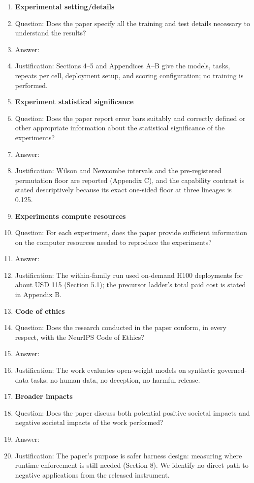 \documentclass{article}
\begin{document}
\begin{enumerate}
\item {\bf Experimental setting/details}
    \item[] Question: Does the paper specify all the training and test details necessary to understand the results?
    \item[] Answer: \answerYes{}
    \item[] Justification: Sections 4--5 and Appendices A--B give the models, tasks, repeats per cell, deployment setup, and scoring configuration; no training is performed.

\item {\bf Experiment statistical significance}
    \item[] Question: Does the paper report error bars suitably and correctly defined or other appropriate information about the statistical significance of the experiments?
    \item[] Answer: \answerYes{}
    \item[] Justification: Wilson and Newcombe intervals and the pre-registered permutation floor are reported (Appendix C), and the capability contrast is stated descriptively because its exact one-sided floor at three lineages is 0.125.

\item {\bf Experiments compute resources}
    \item[] Question: For each experiment, does the paper provide sufficient information on the computer resources needed to reproduce the experiments?
    \item[] Answer: \answerYes{}
    \item[] Justification: The within-family run used on-demand H100 deployments for about USD 115 (Section 5.1); the precursor ladder's total paid cost is stated in Appendix B.

\item {\bf Code of ethics}
    \item[] Question: Does the research conducted in the paper conform, in every respect, with the NeurIPS Code of Ethics?
    \item[] Answer: \answerYes{}
    \item[] Justification: The work evaluates open-weight models on synthetic governed-data tasks; no human data, no deception, no harmful release.

\item {\bf Broader impacts}
    \item[] Question: Does the paper discuss both potential positive societal impacts and negative societal impacts of the work performed?
    \item[] Answer: \answerYes{}
    \item[] Justification: The paper's purpose is safer harness design: measuring where runtime enforcement is still needed (Section 8). We identify no direct path to negative applications from the released instrument.


\end{enumerate}
\end{document}
